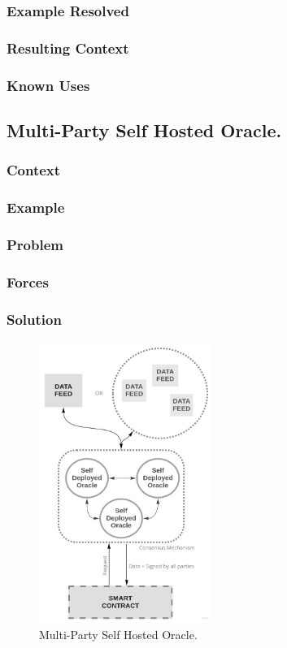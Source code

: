 \subsubsection{Example Resolved}
\subsubsection{Resulting Context}
\subsubsection{Known Uses}

\subsection{Multi-Party Self Hosted Oracle.}

\subsubsection{Context}
\subsubsection{Example}
\subsubsection{Problem}
\subsubsection{Forces}
\subsubsection{Solution}

\begin{figure}[t]
  \begin{center}
    \leavevmode
    \includegraphics[width=0.5\textwidth]{figures/oraclearch4.jpg}
    \caption{Multi-Party Self Hosted Oracle.}
    \label{fig:/figures/paper-screening}
  \end{center}
\end{figure}

